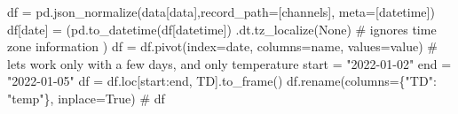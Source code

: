 \documentclass[
  letterpaper,
  DIV=11,
  numbers=noendperiod,
  oneside]{scrreprt}
\newenvironment{Shaded}{\begin{snugshade}}{\end{snugshade}}
\newcommand{\CommentTok}[1]{\textcolor[rgb]{0.37,0.37,0.37}{#1}}
\newcommand{\NormalTok}[1]{\textcolor[rgb]{0.00,0.23,0.31}{#1}}
\newcommand{\OperatorTok}[1]{\textcolor[rgb]{0.37,0.37,0.37}{#1}}
\newcommand{\StringTok}[1]{\textcolor[rgb]{0.13,0.47,0.30}{#1}}
\newcommand{\VariableTok}[1]{\textcolor[rgb]{0.07,0.07,0.07}{#1}}
\begin{document}
\begin{Shaded}
\begin{Highlighting}[]
\NormalTok{df }\OperatorTok{=}\NormalTok{ pd.json\_normalize(data[}\StringTok{\textquotesingle{}data\textquotesingle{}}\NormalTok{],record\_path}\OperatorTok{=}\NormalTok{[}\StringTok{\textquotesingle{}channels\textquotesingle{}}\NormalTok{], meta}\OperatorTok{=}\NormalTok{[}\StringTok{\textquotesingle{}datetime\textquotesingle{}}\NormalTok{])}
\NormalTok{df[}\StringTok{\textquotesingle{}date\textquotesingle{}}\NormalTok{] }\OperatorTok{=}\NormalTok{ (pd.to\_datetime(df[}\StringTok{\textquotesingle{}datetime\textquotesingle{}}\NormalTok{])}
\NormalTok{                .dt.tz\_localize(}\VariableTok{None}\NormalTok{)  }\CommentTok{\# ignores time zone information}
\NormalTok{             )}
\NormalTok{df }\OperatorTok{=}\NormalTok{ df.pivot(index}\OperatorTok{=}\StringTok{\textquotesingle{}date\textquotesingle{}}\NormalTok{, columns}\OperatorTok{=}\StringTok{\textquotesingle{}name\textquotesingle{}}\NormalTok{, values}\OperatorTok{=}\StringTok{\textquotesingle{}value\textquotesingle{}}\NormalTok{)}
\CommentTok{\# let\textquotesingle{}s work only with a few days, and only temperature}
\NormalTok{start }\OperatorTok{=} \StringTok{"2022{-}01{-}02"}
\NormalTok{end }\OperatorTok{=} \StringTok{"2022{-}01{-}05"}
\NormalTok{df }\OperatorTok{=}\NormalTok{ df.loc[start:end, }\StringTok{\textquotesingle{}TD\textquotesingle{}}\NormalTok{].to\_frame()}
\NormalTok{df.rename(columns}\OperatorTok{=}\NormalTok{\{}\StringTok{"TD"}\NormalTok{: }\StringTok{"temp"}\NormalTok{\}, inplace}\OperatorTok{=}\VariableTok{True}\NormalTok{)}
\CommentTok{\# df}
\end{Highlighting}
\end{Shaded}
\end{document}
